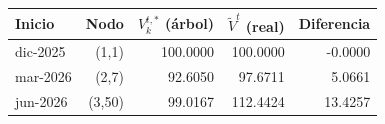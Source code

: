 {\small
\begin{tabular}{lrrrr}
\toprule
Inicio & Nodo & $V^{t,*}_k$ (árbol) & $\tilde V^t$ (real) & Diferencia \\
\midrule
dic-2025 & (1,1) & 100.0000 & 100.0000 & -0.0000 \\
mar-2026 & (2,7) & 92.6050 & 97.6711 & 5.0661 \\
jun-2026 & (3,50) & 99.0167 & 112.4424 & 13.4257 \\
\bottomrule
\end{tabular}
}
